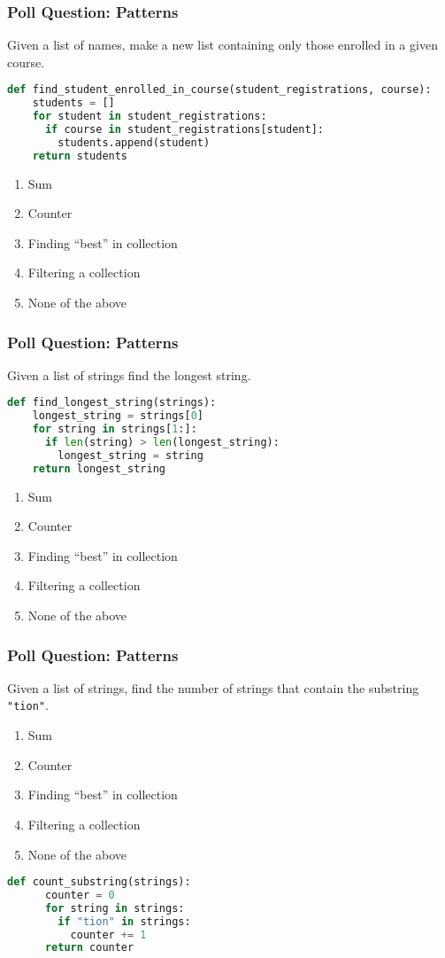 \documentclass{beamer}
\begin{document}
%
%
\begin{frame}[fragile]
  \frametitle{Poll Question: Patterns}
  Given a list of names, make a new list containing only those enrolled in a given course.
  \begin{lstlisting}[language=Python, autogobble]
  def find_student_enrolled_in_course(student_registrations, course):
    students = []
    for student in student_registrations:
      if course in student_registrations[student]:
        students.append(student)
    return students
  \end{lstlisting}
  \begin{enumerate}[A]
    \item Sum
    \item Counter
    \item Finding ``best'' in collection
    \item Filtering a collection
    \item None of the above
  \end{enumerate}
\end{frame}

%
%
\begin{frame}[fragile]
  \frametitle{Poll Question: Patterns}
  Given a list of strings find the longest string.
  \begin{lstlisting}[language=Python, autogobble]
  def find_longest_string(strings):
    longest_string = strings[0]
    for string in strings[1:]:
      if len(string) > len(longest_string):
        longest_string = string
    return longest_string
  \end{lstlisting}
  \vfill
  \begin{enumerate}[A]
    \item Sum
    \item Counter
    \item Finding ``best'' in collection
    \item Filtering a collection
    \item None of the above
  \end{enumerate}
\end{frame}

%
%
\begin{frame}[fragile]
  \frametitle{Poll Question: Patterns}
  Given a list of strings, find the number of strings that contain the substring \lstinline|"tion"|.
  \begin{enumerate}[A]
    \item Sum
    \item Counter
    \item Finding ``best'' in collection
    \item Filtering a collection
    \item None of the above
  \end{enumerate}
  \vfill
  \begin{lstlisting}[language=Python, autogobble]
    def count_substring(strings):
      counter = 0
      for string in strings:
        if "tion" in strings:
          counter += 1
      return counter
  \end{lstlisting}
\end{frame}
\end{document}
